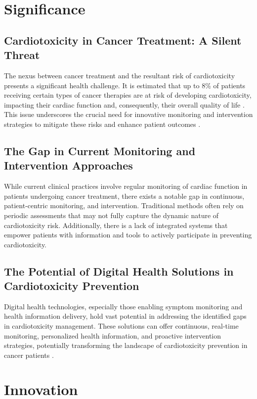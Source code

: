 \documentclass[11pt]{article}
\begin{document}
\section{Significance}

\subsection{Cardiotoxicity in Cancer Treatment:  A Silent Threat} The nexus between
cancer treatment and the resultant risk of cardiotoxicity presents a significant
health challenge. It is estimated that up to 8\% of patients receiving certain
types of cancer therapies are at risk of developing cardiotoxicity, impacting
their cardiac function and, consequently, their overall quality of life \cite{limaCardiotoxicityCancerPatients2022}. This
issue underscores the crucial need for innovative monitoring and intervention
strategies to mitigate these risks and enhance patient outcomes \cite{alemanCardiovascularDiseaseCancer2014}.

\subsection{The Gap in Current Monitoring and Intervention Approaches} While current
clinical practices involve regular monitoring of cardiac function in patients
undergoing cancer treatment, there exists a notable gap in continuous,
patient-centric monitoring, and intervention. Traditional methods often rely on
periodic assessments that may not fully capture the dynamic nature of
cardiotoxicity risk. Additionally, there is a lack of integrated systems that
empower patients with information and tools to actively participate in
preventing cardiotoxicity.

\subsection{The Potential of Digital Health Solutions in Cardiotoxicity Prevention}
Digital health technologies, especially those enabling symptom monitoring and
health information delivery, hold vast potential in addressing the identified
gaps in cardiotoxicity management. These solutions can offer continuous,
real-time monitoring, personalized health information, and proactive
intervention strategies, potentially transforming the landscape of
cardiotoxicity prevention in cancer patients \cite{sturgeonPopulationbasedStudyCardiovascular2019}.

\section{Innovation}
\end{document}
